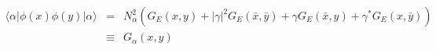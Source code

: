 \begin{equation}
  \label{eq:free13}
  \begin{array}{lll}
  \langle\alpha|\phi(x)\phi(y)|\alpha\rangle &=&  N_\alpha^2 \left(G_E(x,y)+|\gamma|^2 G_E(\bar x,\bar y)+\gamma G_E(\bar 
x,y)+\gamma^{*} G_E(x,\bar y) \right) \\
  &\equiv& G_\alpha(x,y)
  \end{array}
\end{equation}

